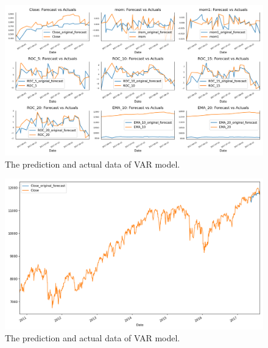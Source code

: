 \begin{figure}[H]
    \centering
    \begin{minipage}[b]{1\textwidth}
        \includegraphics[width=\textwidth]{manuscript/src/figures/Ass2/Ass2_Q4_Rolling_Forecast_vs_Actuals.png}
    \end{minipage}
    \caption{The prediction and actual data of VAR model.}
    \label{fig:Ass2_Q4_Rolling_Forecast_vs_Actuals}
\end{figure}

\begin{figure}[H]
    \centering
    \begin{minipage}[b]{1\textwidth}
        \includegraphics[width=\textwidth]{manuscript/src/figures/Ass2/Ass2_Q4_Rolling_Forecast_vs_Actuals_of_close.png}
    \end{minipage}
    \caption{The prediction and actual data of VAR model.}
    \label{fig:Ass2_Q4_Rolling_Forecast_vs_Actuals_of_close}
\end{figure}